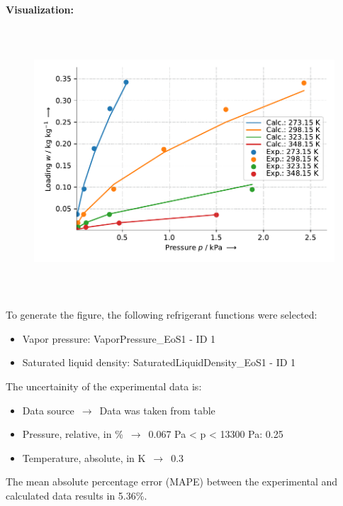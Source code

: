 \textbf{Visualization:}
%
\begin{figure}[!htp]
{\noindent\includegraphics[height=10cm, keepaspectratio]{figs/ads/ads_Water_silica_gel_pellet__Toth_1.pdf}}
\end{figure}
%

To generate the figure, the following refrigerant functions were selected:
\begin{itemize}
\item Vapor pressure: VaporPressure\_EoS1 - ID 1
\item Saturated liquid density: SaturatedLiquidDensity\_EoS1 - ID 1
\end{itemize}

The uncertainity of the experimental data is:
\begin{itemize}
\item Data source $\,\to\,$ Data was taken from table
\item Pressure, relative, in \% $\,\to\,$ 0.067 Pa < p < 13300 Pa: 0.25%
\item Temperature, absolute, in $\si{\kelvin}$ $\,\to\,$ 0.3
\end{itemize}

The mean absolute percentage error (MAPE) between the experimental and calculated data results in 5.36\%.
\FloatBarrier
\newpage
